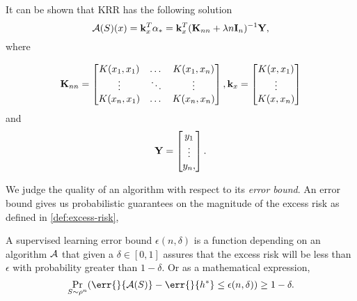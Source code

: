 It can be shown that KRR has the following solution
\begin{equation}
\label{eq:krr-equation} \mathcal{A}(S)(x) = \mathbf{k}_{x}^{T} \mathbf{\alpha}_{\ast} =
\mathbf{k}_{x}^{T} (\mathbf{K}_{nn} + \lambda n \mathbf{I}_{n})^{-1}\mathbf{Y},
\end{equation} where

\begin{equation*}
  \mathbf{K}_{nn} =
  \begin{bmatrix}
    K(x_{1}, x_{1}) & \dots & K(x_{1}, x_{n}) \\
    \vdots & \ddots & \vdots \\
    K(x_{n}, x_{1}) & \dots & K(x_{n}, x_{n})
  \end{bmatrix}
  , \mathbf{k}_{x} =
  \begin{bmatrix}
    K(x, x_{1}) \\ \vdots \\ K(x, x_{n})
  \end{bmatrix}
\end{equation*} and
\begin{equation*}
  \mathbf{Y} =
  \begin{bmatrix}
    y_1 \\ \vdots \\ y_n, 
  \end{bmatrix}
  .
\end{equation*}

We judge the quality of an algorithm with respect to its \emph{error bound}. An
error bound gives us probabilistic guarantees on the magnitude of the excess
risk as defined in \ref{def:excess-risk},
\begin{definition}
  \label{def:error-bound-sl} A supervised learning error bound \(\epsilon(n,
\delta)\) is a function depending on an algorithm \(\mathcal{A}\) that given a
\(\delta \in [0, 1]\) assures that the excess risk will be less than
\(\epsilon\) with probability greater than \(1 - \delta\). Or as a mathematical
expression,
  \begin{equation} \Pr_{S \sim \rho^n}(\err{}{\algo(S)} - \err{}{h^{\ast}} \leq
\epsilon(n, \delta)) \geq 1 - \delta.
  \end{equation}
\end{definition}

